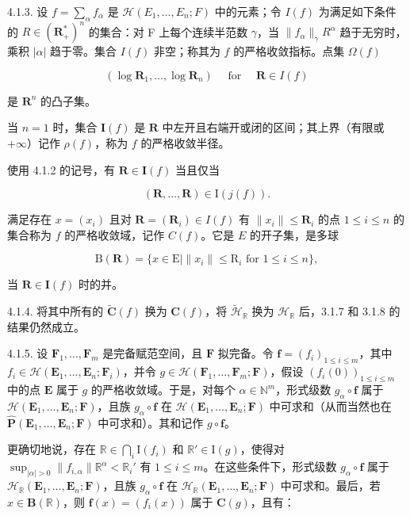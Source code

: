 4.1.3. 设 \(f = \sum_{\alpha} f_{\alpha}\) 是 \(\mathcal{H}(E_1, \ldots, E_n; F)\) 中的元素；令 \(I(f)\) 为满足如下条件的 \(R \in (\mathbf{R}_+^*)^n\) 的集合：对 F 上每个连续半范数 \(\gamma\)，当 \(\|f_{\alpha}\|_{\gamma} R^{\alpha}\) 趋于无穷时，乘积 \(|\alpha|\) 趋于零。集合 \(I(f)\) 非空；称其为 \(f\) 的严格收敛指标。点集 \(\Omega(f)\)

\[
(\log \mathbf {R} _ {1}, \dots , \log \mathbf {R} _ {n}) \quad \text { for } \quad \mathbf {R} \in I (f)
\]

是 \(\mathbf{R}^{n}\) 的凸子集。

当 \(n=1\) 时，集合 \(\mathbf{I}(f)\) 是 \(\mathbf{R}\) 中左开且右端开或闭的区间；其上界（有限或 \(+\infty\)）记作 \(\rho(f)\)，称为 \(f\) 的严格收敛半径。

使用 4.1.2 的记号，有 \(\mathbf{R} \in \mathbf{I}(f)\) 当且仅当

\[
(\mathbf {R}, \dots , \mathbf {R}) \in \mathrm{I} (j (f)).
\]

满足存在 \(x = (x_i)\) 且对 \(\mathbf{R} = (\mathbf{R}_i) \in I(f)\) 有 \(\| x_i \| \leqslant \mathbf{R}_i\) 的点 \(1 \leqslant i \leqslant n\) 的集合称为 \(f\) 的严格收敛域，记作 \(C(f)\)。它是 \(E\) 的开子集，是多球

\[
\mathrm{B} (\mathbf {R}) = \{x \in \mathrm{E} | \| x _ {i} \| \leqslant \mathrm{R} _ {i} \text {   for   } 1 \leqslant i \leqslant n \},
\]

当 \(\mathbf{R}\in\mathbf{I}(f)\) 时的并。

4.1.4. 将其中所有的 \(\tilde{\mathbf{C}}(f)\) 换为 \(\mathbf{C}(f)\)，将 \(\tilde{\mathcal{H}}_{\mathbb{R}}\) 换为 \(\mathcal{H}_{\mathbb{R}}\) 后，3.1.7 和 3.1.8 的结果仍然成立。

4.1.5. 设 \(\mathbf{F}_1, \ldots, \mathbf{F}_m\) 是完备赋范空间，且 \(\mathbf{F}\) 拟完备。令 \(\mathbf{f} = (f_i)_{1 \leqslant i \leqslant m}\)，其中 \(f_i \in \mathcal{H}(\mathbf{E}_1, \ldots, \mathbf{E}_n; \mathbf{F}_i)\)，并令 \(g \in \mathcal{H}(\mathbf{F}_1, \ldots, \mathbf{F}_m; \mathbf{F})\)，假设 \((f_i(0))_{1 \leqslant i \leqslant m}\) 中的点 \(\mathbf{E}\) 属于 \(g\) 的严格收敛域。于是，对每个 \(\alpha \in \mathbb{N}^m\)，形式级数 \(g_\alpha \circ \mathbf{f}\) 属于 \(\mathcal{H}(\mathbf{E}_1, \ldots, \mathbf{E}_n; \mathbf{F})\)，且族 \(g_\alpha \circ \mathbf{f}\) 在 \(\mathcal{H}(\mathbf{E}_1, \ldots, \mathbf{E}_n; \mathbf{F})\) 中可求和（从而当然也在 \(\hat{\mathbf{P}}(\mathbf{E}_1, \ldots, \mathbf{E}_n; \mathbf{F})\) 中可求和）。其和记作 \(g \circ \mathbf{f}\)。

更确切地说，存在 \(\mathbb{R} \in \bigcap_{i} \mathrm{I}(f_i)\) 和 \(\mathbb{R}' \in \mathrm{I}(g)\)，使得对 \(\sup_{|\alpha| > 0} \| f_{i,\alpha} \| \mathbb{R}^{\alpha} < \mathbb{R}_i'\) 有 \(1 \leqslant i \leqslant m\)。在这些条件下，形式级数 \(g_{\alpha} \circ \mathbf{f}\) 属于 \(\mathcal{H}_{\mathbb{R}}(\mathbf{E}_1, \ldots, \mathbf{E}_n; \mathbf{F})\)，且族 \(g_{\alpha} \circ \mathbf{f}\) 在 \(\mathcal{H}_{\mathbb{R}}(\mathbf{E}_1, \ldots, \mathbf{E}_n; \mathbf{F})\) 中可求和。最后，若 \(x \in \mathbf{B}(\mathbb{R})\)，则 \(\mathbf{f}(x) = (f_i(x))\) 属于 \(\mathbf{C}(g)\)，且有：

